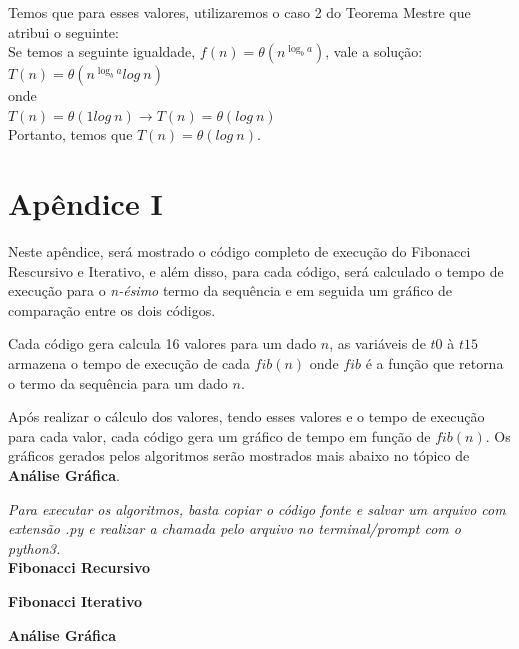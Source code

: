 \documentclass[a4paper, 12pt]{article}
\begin{document}
Temos que para esses valores, utilizaremos o caso 2 do Teorema Mestre que atribui o seguinte:\\

Se temos a seguinte igualdade, $f(n) = \theta(n^{\log_b a})$, vale a solução:\\

$T(n) = \theta(n^{\log_b a}log \ n)$ \\

onde \\

$T(n) = \theta(1log \ n) \rightarrow T(n) = \theta(log \ n)$ \\

Portanto, temos que $T(n) = \theta(log \ n)$.

\newpage
\section{Apêndice I}
Neste apêndice, será mostrado o código completo de execução do Fibonacci Rescursivo e Iterativo, e além disso, para cada código, será calculado o tempo de execução para o {\it n-ésimo} termo da sequência e em seguida um gráfico de comparação entre os dois códigos.

Cada código gera calcula 16 valores para um dado $n$, as variáveis de $t0$ à $t15$ armazena o tempo de execução de cada $fib(n)$ onde $fib$ é a função que retorna o termo da sequência para um dado $n$.

Após realizar o cálculo dos valores, tendo esses valores e o tempo de execução para cada valor, cada código gera um gráfico de tempo em função de $fib(n)$. Os gráficos gerados pelos algoritmos serão mostrados mais abaixo no tópico de {\bf Análise Gráfica}.

{\it Para executar os algoritmos, basta copiar o código fonte e salvar um arquivo com extensão .py e realizar a chamada pelo arquivo no terminal/prompt com o python3.}\\

{\large\bf Fibonacci Recursivo}

\vspace{0.3cm}
{\large\bf\quad Fibonacci Iterativo}


\newpage

{\LARGE\bf Análise Gráfica}\\
\end{document}
